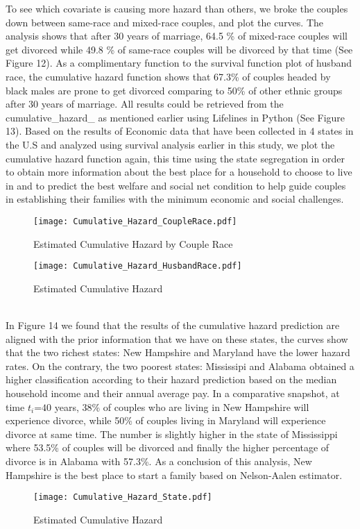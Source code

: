 \documentclass[10pt,twocolumn]{article}
\begin{document}
To see which covariate is causing more hazard than others, we broke the couples down between same-race and mixed-race couples, and plot the curves. The analysis shows that after 30 years of marriage, 64.5 \% of mixed-race couples will get divorced while 49.8 \% of same-race couples will be divorced by that time (See Figure 12).  As a complimentary function to the survival function plot of husband race, the cumulative hazard function shows that 67.3\% of couples headed by black males are prone to get divorced comparing to 50\% of other ethnic groups after 30 years of marriage. All results could be retrieved from the cumulative\_hazard\_ as mentioned earlier using Lifelines in Python (See Figure 13). 
Based on the results of Economic data that have been collected in 4 states in the U.S and analyzed using survival analysis earlier in this study, we plot the cumulative hazard function again, this time using the state segregation in order to obtain more information about the best place for a household to choose to live in and to predict the best welfare and social net condition to help guide couples in establishing their families with the minimum economic and social challenges.\\  
\begin{figure}[!htb]
\centering
\texttt{[image: Cumulative\_Hazard\_CoupleRace.pdf]}
\caption{Estimated Cumulative Hazard by Couple Race}
\label{Fig:Estimated Cumulative Hazard Couple Race}
\end{figure}
\begin{figure}[!htb]
\centering
\texttt{[image: Cumulative\_Hazard\_HusbandRace.pdf]}
\caption{Estimated Cumulative Hazard}
\label{Fig:Estimated Cumulative Hazard}
\end{figure}
\\In Figure 14 we found that the results of the cumulative hazard prediction are aligned with the prior information that we have on these states, the curves show that the two richest states: New Hampshire and Maryland have the lower hazard rates. On the contrary, the two poorest states: Mississipi and Alabama obtained a higher classification according to their hazard prediction based on the median household income and their annual average pay. In a comparative snapshot, at time $t_i$=$40$ years, 38\% of couples who are living in New Hampshire will experience divorce, while 50\%  of couples living in Maryland will experience divorce at same time. The number is slightly higher in the state of Mississippi where 53.5\% of couples will be divorced and finally the higher percentage of divorce is in Alabama with 57.3\%. As a conclusion of this analysis, New Hampshire is the best place to start a family based on Nelson-Aalen estimator.
\begin{figure}[!htb]
\centering
\texttt{[image: Cumulative\_Hazard\_State.pdf]}
\caption{Estimated Cumulative Hazard}
\label{Fig:Estimated Cumulative Hazard}
\end{figure}
\end{document}
